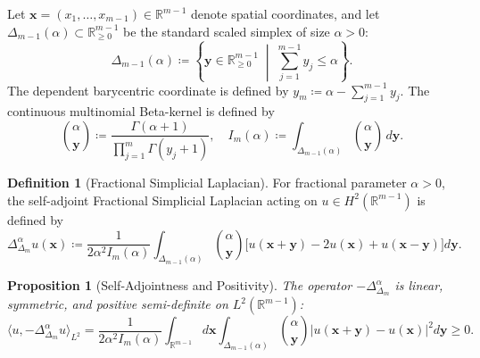 \documentclass[11pt,a4paper]{article}
\theoremstyle{plain}
\newtheorem{proposition}[theorem]{Proposition}
\theoremstyle{definition}
\newtheorem{definition}[theorem]{Definition}
\theoremstyle{remark}
\numberwithin{equation}{section}
\begin{document}
Let $\mathbf{x} = (x_1, \dots, x_{m-1}) \in \mathbb{R}^{m-1}$ denote spatial coordinates, and let $\Delta_{m-1}(\alpha) \subset \mathbb{R}_{\ge 0}^{m-1}$ be the standard scaled simplex of size $\alpha > 0$:
\begin{equation}
\Delta_{m-1}(\alpha) \coloneqq \left\{\mathbf{y} \in \mathbb{R}_{\ge 0}^{m-1} \;\middle|\; \sum_{j=1}^{m-1} y_j \le \alpha\right\}.
\end{equation}
The dependent barycentric coordinate is defined by $y_m \coloneqq \alpha - \sum_{j=1}^{m-1} y_j$. The continuous multinomial Beta-kernel is defined by
\begin{equation}
\binom{\alpha}{\mathbf{y}} \coloneqq \frac{\Gamma(\alpha+1)}{\prod_{j=1}^m \Gamma(y_j+1)}, \quad I_m(\alpha) \coloneqq \int_{\Delta_{m-1}(\alpha)} \binom{\alpha}{\mathbf{y}} \, d\mathbf{y}.
\end{equation}

\begin{definition}[Fractional Simplicial Laplacian]
For fractional parameter $\alpha > 0$, the self-adjoint Fractional Simplicial Laplacian acting on $u \in H^2(\mathbb{R}^{m-1})$ is defined by
\begin{equation}
\label{eq:simplicial_laplacian_def}
\Delta_{\Delta_m}^\alpha u(\mathbf{x}) \coloneqq \frac{1}{2\alpha^2 I_m(\alpha)}\int_{\Delta_{m-1}(\alpha)} \binom{\alpha}{\mathbf{y}} \Big[u(\mathbf{x}+\mathbf{y}) - 2u(\mathbf{x}) + u(\mathbf{x}-\mathbf{y})\Big] d\mathbf{y}.
\end{equation}
\end{definition}

\begin{proposition}[Self-Adjointness and Positivity]
The operator $-\Delta_{\Delta_m}^\alpha$ is linear, symmetric, and positive semi-definite on $L^2(\mathbb{R}^{m-1})$:
\begin{equation}
\langle u, -\Delta_{\Delta_m}^\alpha u \rangle_{L^2} = \frac{1}{2\alpha^2 I_m(\alpha)}\int_{\mathbb{R}^{m-1}} d\mathbf{x} \int_{\Delta_{m-1}(\alpha)} \binom{\alpha}{\mathbf{y}} |u(\mathbf{x}+\mathbf{y}) - u(\mathbf{x})|^2 d\mathbf{y} \ge 0.
\end{equation}
\end{proposition}
\end{document}
